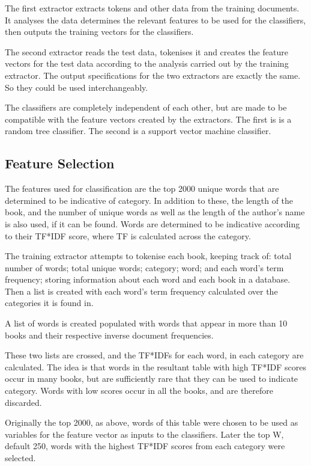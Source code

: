 \documentclass[11pt]{article}
\begin{document}
The first extractor extracts tokens and other data from the training documents.
It analyses the data determines the relevant features to be used for the
classifiers, then outputs the training vectors for the classifiers. 

The second extractor reads the test data, tokenises it and creates the feature
vectors for the test data according to the analysis carried out by the training
extractor. The output specifications for the two extractors are exactly the
same. So they could be used interchangeably.

The classifiers are completely independent of each other, but are made to be
compatible with the feature vectors created by the extractors. The first is is a
random tree classifier. The second is a support vector machine classifier.

\subsection{Feature Selection}

The features used for classification are the top 2000 unique words that are
determined to be indicative of category. In addition to these, the length of the
book, and the number of unique words as well as the length of the author's name
is also used, if it can be found.  Words are determined to be indicative
according to their TF*IDF score, where TF is calculated across the category.

The training extractor attempts to tokenise each book, keeping track of: total
number of words; total unique words; category; word; and each word's term
frequency; storing information about each word and each book in a database.
Then a list is created with each word's term frequency calculated over the
categories it is found in.

A list of words is created populated with words that appear in more than 10
books and their respective inverse document frequencies. 

These two lists are crossed, and the TF*IDFs for each word, in each category are
calculated. The idea is that words in the resultant table with high TF*IDF
scores occur in many books, but are sufficiently rare that they can be used to
indicate category. Words with low scores occur in all the books, and are
therefore discarded.

Originally the top 2000, as above, words of this table were chosen to be used as
variables for the feature vector as inputs to the classifiers. Later the top W,
default 250, words with the highest TF*IDF scores from each category were
selected.
\end{document}
